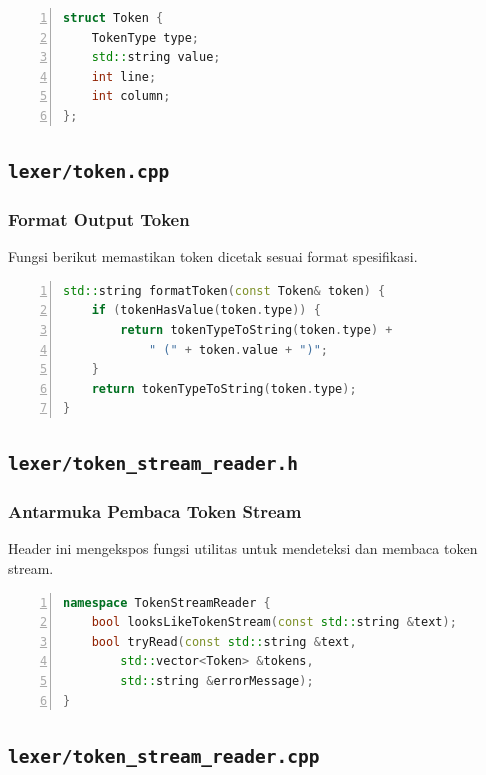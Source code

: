 \begin{lstlisting}[language=C++, numbers=left, numberstyle=\tiny, breaklines=true, breakatwhitespace=true, caption={Struct Token pada token.h}, label={lst:token-struct-m2}]
struct Token {
	TokenType type;
	std::string value;
	int line;
	int column;
};
\end{lstlisting}

\subsection{\texttt{lexer/token.cpp}}
\subsubsection{Format Output Token}
Fungsi berikut memastikan token dicetak sesuai format spesifikasi.

\begin{lstlisting}[language=C++, numbers=left, numberstyle=\tiny, breaklines=true, breakatwhitespace=true, caption={Implementasi formatToken pada token.cpp}, label={lst:format-token-m2}]
std::string formatToken(const Token& token) {
	if (tokenHasValue(token.type)) {
		return tokenTypeToString(token.type) + 
            " (" + token.value + ")";
	}
	return tokenTypeToString(token.type);
}
\end{lstlisting}

\subsection{\texttt{lexer/token\_stream\_reader.h}}
\subsubsection{Antarmuka Pembaca Token Stream}
Header ini mengekspos fungsi utilitas untuk mendeteksi dan membaca token stream.

\begin{lstlisting}[language=C++, numbers=left, numberstyle=\tiny, breaklines=true, breakatwhitespace=true, caption={Deklarasi TokenStreamReader}, label={lst:token-stream-api}]
namespace TokenStreamReader {
	bool looksLikeTokenStream(const std::string &text);
	bool tryRead(const std::string &text, 
        std::vector<Token> &tokens,
        std::string &errorMessage);
}
\end{lstlisting}

\subsection{\texttt{lexer/token\_stream\_reader.cpp}}
